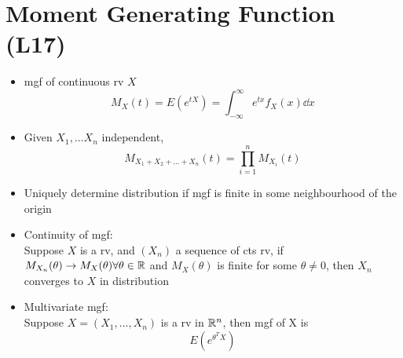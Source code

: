 \section{Moment Generating Function (L17)}
\begin{itemize}
      \item mgf of continuous rv $X$ \[M_X(t) = E(e^{tX}) = \int_{-\infty}^{\infty} e^{tx} f_X(x) \dd x\]
      \item Given $X_1,\dots X_n$ independent, \[M_{X_1+X_2+\dots+X_n}(t) = \prod_{i=1}^n M_{X_i}(t)\]
      \item Uniquely determine distribution if mgf is finite in some neighbourhood of the origin
      \item Continuity of mgf: \\
            Suppose $X$ is a rv, and $(X_n)$ a sequence of cts rv, if $M_{X_n}(\theta) \to M_{X}(\theta) \forall \theta \in \mathbb{R}$ and $M_X(\theta)$ is finite for some $\theta \neq 0$, then $X_n$ converges to $X$ in distribution
      \item Multivariate mgf: \\
            Suppose $X = (X_1,\dots,X_n)$ is a rv in $\mathbb{R}^n$, then mgf of X is \[E(e^{\theta^T X})\]

\end{itemize}


